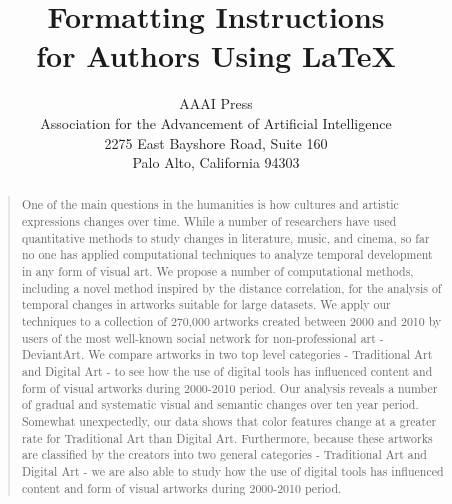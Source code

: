 \documentclass[letterpaper]{article}
\begin{document}
%
\title{Formatting Instructions \\for Authors Using \LaTeX{}}
\author{AAAI Press\\
Association for the Advancement of Artificial Intelligence\\
2275 East Bayshore Road, Suite 160\\
Palo Alto, California 94303\\
}
\maketitle
\begin{abstract}
\begin{quote}
One of the main questions in the humanities is how cultures and artistic expressions changes over time. While a number of researchers have used quantitative methods to study changes in literature, music, and cinema, so far no one has applied computational techniques to analyze temporal development in any form of visual art. We propose a number of computational methods, including a novel method inspired by the distance correlation, for the analysis of temporal changes in artworks suitable for large datasets. We apply our techniques to a collection of 270,000 artworks created between 2000 and 2010 by users of the most well-known social network for non-professional art - DeviantArt. We compare artworks in two top level categories - Traditional Art and Digital Art - to see how the use of digital tools has influenced content and form of visual artworks during 2000-2010 period. Our analysis reveals a number of gradual and systematic visual and semantic changes over ten year period. Somewhat unexpectedly, our data shows that color features change at a greater rate for Traditional Art than Digital Art. Furthermore, because these artworks are classified by the creators into two general categories - Traditional Art and Digital Art - we are also able to study how the use of digital tools has influenced content and form of visual artworks during 2000-2010 period. 

\end{quote}
\end{abstract}
\end{document}
